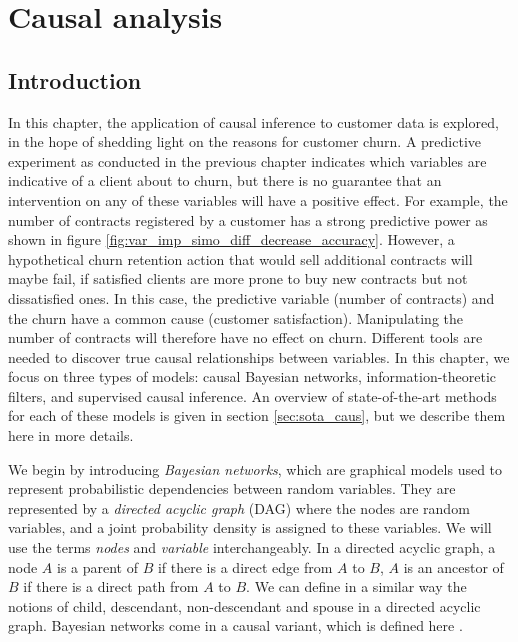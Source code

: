 \chapter{Causal analysis}
\label{ch:caus}

\section{Introduction}
\label{sec:causal_intro}

In this chapter, the application of causal inference to customer data is
explored, in the hope of shedding light on the reasons for customer churn. A
predictive experiment as conducted in the previous chapter indicates which
variables are indicative of a client about to churn, but there is no guarantee
that an intervention on any of these variables will have a positive effect. For
example, the number of contracts registered by a customer has a strong
predictive power as shown in figure
\ref{fig:var_imp_simo_diff_decrease_accuracy}. However, a hypothetical churn
retention action that would sell additional contracts will maybe fail, if
satisfied clients are more prone to buy new contracts but not dissatisfied ones.
In this case, the predictive variable  (number of contracts) and the churn have
a common cause (customer satisfaction). Manipulating the number of contracts
will therefore have no effect on churn. Different tools are needed to discover
true causal relationships between variables. In this chapter, we focus on three
types of models: causal Bayesian networks, information-theoretic filters, and
supervised causal inference. An overview of state-of-the-art methods for each of
these models is given in section \ref{sec:sota_caus}, but we describe them here
in more details.

We begin by introducing \emph{Bayesian networks}, which are graphical models
used to represent probabilistic dependencies between random variables. They are
represented by a \emph{directed acyclic graph} (DAG) where the nodes are random
variables, and a joint probability density is assigned to these variables. We
will use the terms \emph{nodes} and \emph{variable} interchangeably. In a
directed acyclic graph, a node $A$ is a parent of $B$ if there is a direct edge
from $A$ to $B$, $A$ is an ancestor of $B$ if there is a direct path from $A$ to
$B$. We can define in a similar way the notions of child, descendant,
non-descendant and spouse in a directed acyclic graph. Bayesian networks come in
a causal variant, which is defined here \parencite{guyon2007causal}.

